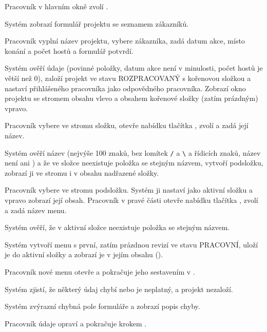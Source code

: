\begin{ucsteps}
  \item \label{uc:02:1}Pracovník v hlavním okně zvolí .
  \item \label{uc:02:2}Systém zobrazí formulář projektu se seznamem zákazníků. 
  \item \label{uc:02:3}Pracovník vyplní název projektu, vybere zákazníka, zadá datum akce, místo konání a počet hostů a formulář potvrdí.
  \item \label{uc:02:4}Systém ověří údaje (povinné položky, datum akce není v minulosti, počet hostů je větší než 0), založí projekt ve stavu ROZPRACOVANÝ s kořenovou složkou a nastaví přihlášeného pracovníka jako odpovědného pracovníka. Zobrazí okno projektu se stromem obsahu vlevo a obsahem kořenové složky (zatím prázdným) vpravo. 
  \item \label{uc:02:5}Pracovník vybere ve stromu složku, otevře nabídku tlačítka , zvolí  a zadá její název.
  \item \label{uc:02:6}Systém ověří název (nejvýše 100 znaků, bez lomítek \texttt{/} a \texttt{\textbackslash} a řídicích znaků, název není  ani ) a že ve složce neexistuje položka se stejným názvem, vytvoří podsložku, zobrazí ji ve stromu i v obsahu nadřazené složky. 
  \item \label{uc:02:7}Pracovník vybere ve stromu podsložku. Systém ji nastaví jako aktivní složku a vpravo zobrazí její obsah. Pracovník v pravé části otevře nabídku tlačítka , zvolí  a zadá název menu. 
  \item \label{uc:02:8}Systém ověří, že v aktivní složce neexistuje položka se stejným názvem. 
  \item \label{uc:02:9}Systém vytvoří menu s první, zatím prázdnou revizí ve stavu PRACOVNÍ, uloží je do aktivní složky a zobrazí je v jejím obsahu ().
  \item \label{uc:02:10}Pracovník nové menu otevře a pokračuje jeho sestavením v .
\end{ucsteps}

\begin{ucalt}
  \item[4.1]\label{uc:02:4.1} Systém zjistí, že některý údaj chybí nebo je neplatný, a projekt nezaloží.
  \item[4.2]\label{uc:02:4.2} Systém zvýrazní chybná pole formuláře a zobrazí popis chyby.
  \item[4.3]\label{uc:02:4.3} Pracovník údaje opraví a pokračuje krokem .
\end{ucalt}

